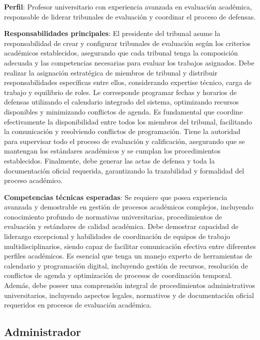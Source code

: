 \documentclass[12pt,a4paper,oneside]{report}
\begin{document}
\textbf{Perfil}: Profesor universitario con experiencia avanzada en
evaluación académica, responsable de liderar tribunales de evaluación y
coordinar el proceso de defensas.

\textbf{Responsabilidades principales}: El presidente del tribunal asume la responsabilidad de crear y configurar tribunales de evaluación según los criterios académicos establecidos, asegurando que cada tribunal tenga la composición adecuada y las competencias necesarias para evaluar los trabajos asignados. Debe realizar la asignación estratégica de miembros de tribunal y distribuir responsabilidades específicas entre ellos, considerando expertise técnico, carga de trabajo y equilibrio de roles. Le corresponde programar fechas y horarios de defensas utilizando el calendario integrado del sistema, optimizando recursos disponibles y minimizando conflictos de agenda. Es fundamental que coordine efectivamente la disponibilidad entre todos los miembros del tribunal, facilitando la comunicación y resolviendo conflictos de programación. Tiene la autoridad para supervisar todo el proceso de evaluación y calificación, asegurando que se mantengan los estándares académicos y se cumplan los procedimientos establecidos. Finalmente, debe generar las actas de defensa y toda la documentación oficial requerida, garantizando la trazabilidad y formalidad del proceso académico.

\textbf{Competencias técnicas esperadas}: Se requiere que posea experiencia avanzada y demostrable en gestión de procesos académicos complejos, incluyendo conocimiento profundo de normativas universitarias, procedimientos de evaluación y estándares de calidad académica. Debe demostrar capacidad de liderazgo excepcional y habilidades de coordinación de equipos de trabajo multidisciplinarios, siendo capaz de facilitar comunicación efectiva entre diferentes perfiles académicos. Es esencial que tenga un manejo experto de herramientas de calendario y programación digital, incluyendo gestión de recursos, resolución de conflictos de agenda y optimización de procesos de coordinación temporal. Además, debe poseer una comprensión integral de procedimientos administrativos universitarios, incluyendo aspectos legales, normativos y de documentación oficial requeridos en procesos de evaluación académica.

\subsection{Administrador}\label{administrador}
\end{document}
